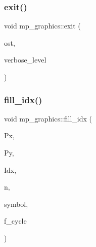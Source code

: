 \mbox{\label{classmp__graphics_a7edc9d2511b80f80e0711b6723ef9682}} 
\subsubsection{\texorpdfstring{exit()}{exit()}}
{\footnotesize\ttfamily void mp\+\_\+graphics\+::exit (\begin{DoxyParamCaption}\item[{ostream \&}]{ost,  }\item[{\mbox{\hyperlink{galois_8h_a09fddde158a3a20bd2dcadb609de11dc}{I\+NT}}}]{verbose\+\_\+level }\end{DoxyParamCaption})}

\mbox{\label{classmp__graphics_a185e833954f00af0df61939e3b3da294}} 
\subsubsection{\texorpdfstring{fill\+\_\+idx()}{fill\_idx()}}
{\footnotesize\ttfamily void mp\+\_\+graphics\+::fill\+\_\+idx (\begin{DoxyParamCaption}\item[{\mbox{\hyperlink{galois_8h_a09fddde158a3a20bd2dcadb609de11dc}{I\+NT}} $\ast$}]{Px,  }\item[{\mbox{\hyperlink{galois_8h_a09fddde158a3a20bd2dcadb609de11dc}{I\+NT}} $\ast$}]{Py,  }\item[{\mbox{\hyperlink{galois_8h_a09fddde158a3a20bd2dcadb609de11dc}{I\+NT}} $\ast$}]{Idx,  }\item[{\mbox{\hyperlink{galois_8h_a09fddde158a3a20bd2dcadb609de11dc}{I\+NT}}}]{n,  }\item[{const char $\ast$}]{symbol,  }\item[{\mbox{\hyperlink{galois_8h_a09fddde158a3a20bd2dcadb609de11dc}{I\+NT}}}]{f\+\_\+cycle }\end{DoxyParamCaption})}

\mbox{\label{classmp__graphics_a54cc0cb42fd5e93e7519d3b71c5fe6dc}} 
